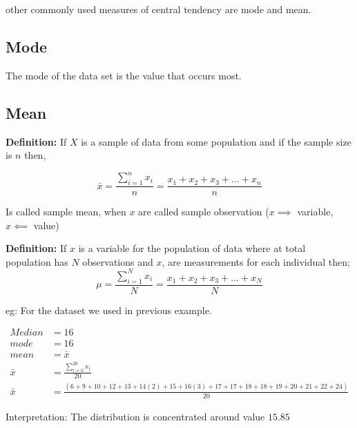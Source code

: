 \documentclass[12pt]{article}
\begin{document}
other commonly used measures of central tendency are mode and mean.
\subsection{Mode}
The mode of the data set is the value that occurs most.
\subsection{Mean}

\textbf{Definition: }If $X$ is a sample of data from some population and if the sample size is $n$ then,


\begin{equation}
    \bar{x} = \frac{\sum_{i = 1}^{n} x_i}{n}= \frac{x_1 + x_2 + x_3 + \ldots + x_n}{n}
\end{equation}

Is called sample mean, when $x$ are called sample observation ($x \implies$ variable, $x \impliedby$ value)

\textbf{Definition: }If $x$ is a variable for the population of data where at total population has $N$ observations and $x$, are measurements for each individual then;
\begin{equation}
    \mu = \frac{\sum_{i = 1}^{N} x_i}{N}= \frac{x_1 + x_2 + x_3 + \ldots + x_N}{N}
\end{equation}

eg: For the dataset we used in previous example.

\begin{align*}
    Median  & = 16                                                                                                \\
    mode    & = 16                                                                                                \\
    mean    & = \bar{x}                                                                                           \\
    \bar{x} & = \frac{\sum_{i = 0}^{20}x_i }{20}                                                                  \\
    \bar{x} & = \frac{(6 + 9 + 10 + 12 +13 + 14(2) +15 + 16(3) + 17 + 17 + 18 + 18 + 19 + 20 + 21 + 22 + 24)}{20}
\end{align*}


Interpretation: The distribution is concentrated around value $15.85$

\newpage
\end{document}
